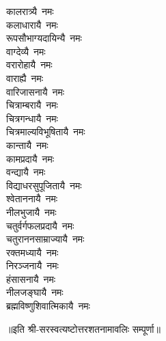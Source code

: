 \begin{multicols}{2}
\begin{flushleft}
कालरात्र्यै~नमः\\
कलाधारायै~नमः\\
रूपसौभाग्यदायिन्यै~नमः\\
वाग्देव्यै~नमः\\
वरारोहायै~नमः\hfill{}\\
वाराह्यै~नमः\\
वारिजासनायै~नमः\\
चित्राम्बरायै~नमः\\
चित्रगन्धायै~नमः\\
चित्रमाल्यविभूषितायै~नमः\\
कान्तायै~नमः\\
कामप्रदायै~नमः\\
वन्द्यायै~नमः\\
विद्याधरसुपूजितायै~नमः\\
श्वेताननायै~नमः\hfill{}\\
नीलभुजायै~नमः\\
चतुर्वर्गफलप्रदायै~नमः\\
चतुराननसाम्राज्यायै~नमः\\
रक्तमध्यायै~नमः\\
निरञ्जनायै~नमः\\
हंसासनायै~नमः\\
नीलजङ्घायै~नमः\\
ब्रह्मविष्णुशिवात्मिकायै~नमः\\
\end{flushleft}
\end{multicols}
॥इति श्री-सरस्वत्यष्टोत्तरशतनामावलिः सम्पूर्णा॥
